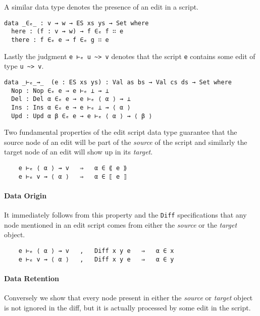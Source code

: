 \documentclass[preprint]{sigplanconf}
\begin{document}
    A similar data type denotes the presence of an edit in a script.

\begin{verbatim}
data _∈ₑ_ : v ⇝ w → ES xs ys → Set where
  here : (f : v ⇝ w) → f ∈ₑ f ∷ e
  there : f ∈ₑ e → f ∈ₑ g ∷ e
\end{verbatim}
    Lastly the judgment \texttt{e ⊢ₑ u \textasciitilde> v} denotes that
    the script \texttt{e} contains some edit of type \texttt{u \textasciitilde> v}.
\begin{verbatim}
data _⊢ₑ_⇝_  (e : ES xs ys) : Val as bs → Val cs ds → Set where
  Nop : Nop ∈ₑ e → e ⊢ₑ ⊥ ⇝ ⊥
  Del : Del α ∈ₑ e → e ⊢ₑ ⟨ α ⟩ ⇝ ⊥
  Ins : Ins α ∈ₑ e → e ⊢ₑ ⊥ ⇝ ⟨ α ⟩
  Upd : Upd α β ∈ₑ e → e ⊢ₑ ⟨ α ⟩ ⇝ ⟨ β ⟩ 
\end{verbatim}
    Two fundamental properties of the edit script data type guarantee that
    the source node of an edit will be part of the \emph{source} of the script and
    similarly the target node of an edit will show up in its \emph{target}.
\begin{verbatim}
    e ⊢ₑ ⟨ α ⟩ ⇝ v   ⇒   α ∈ ⟪ e ⟫
    e ⊢ₑ v ⇝ ⟨ α ⟩   ⇒   α ∈ ⟦ e ⟧
\end{verbatim}

    \paragraph{Data Origin}

    It immediately follows from this property and the \texttt{Diff} specifications 
    that any node mentioned in an edit script comes from either the \emph{source}
    or the \emph{target} object.
\begin{verbatim}
    e ⊢ₑ ⟨ α ⟩ ⇝ v   ,   Diff x y e   ⇒   α ∈ x 
    e ⊢ₑ v ⇝ ⟨ α ⟩   ,   Diff x y e   ⇒   α ∈ y 
\end{verbatim}

    \paragraph{Data Retention}
    Conversely we show that every node present in either the \emph{source} or
    \emph{target} object is not ignored in the diff, but it is 
    actually processed by some edit in the script.
\end{document}
